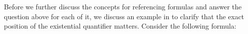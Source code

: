 Before we further discuss the concepts for referencing formulas and answer the question above for each of it, 
we discuss an example in \nthree to clarify that the exact position of the existential quantifier matters.
Consider the following formula:
% 
% 
% 
% 
% 
% 
